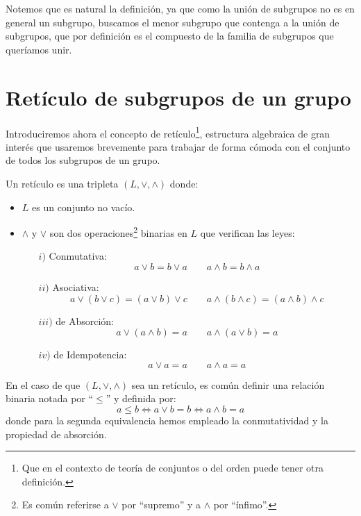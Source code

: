 Notemos que es natural la definición, ya que como la unión de subgrupos no es en general un subgrupo, buscamos el menor subgrupo que contenga a la unión de subgrupos, que por definición es el compuesto de la familia de subgrupos que queríamos unir.

\section{Retículo de subgrupos de un grupo}
Introduciremos ahora el concepto de retículo\footnote{Que en el contexto de teoría de conjuntos o del orden puede tener otra definición.}, estructura algebraica de gran interés que usaremos brevemente para trabajar de forma cómoda con el conjunto de todos los subgrupos de un grupo.

\begin{definicion}[Retículo]
    Un retículo es una tripleta $(L, \lor, \land)$ donde:
    \begin{itemize}
        \item $L$ es un conjunto no vacío.
        \item $\land$ y $\lor$ son dos operaciones\footnote{Es común referirse a $\lor$ por ``supremo'' y a $\land$ por ``ínfimo''.} binarias en $L$ que verifican las leyes:
            \begin{enumerate}
                \item[$i)$] Conmutativa:
                    \begin{equation*}
                        a\lor b = b\lor a \qquad a\land b = b\land a 
                    \end{equation*}
                \item[$ii)$] Asociativa:
                    \begin{equation*}
                        a\lor (b\lor c) = (a\lor b)\lor c \qquad a\land (b\land c) = (a\land b)\land c 
                    \end{equation*}
                \item[$iii)$] de Absorción: 
                    \begin{equation*}
                        a\lor (a\land b) = a \qquad a\land (a\lor b) = a 
                    \end{equation*}
                \item[$iv)$] de Idempotencia:
                    \begin{equation*}
                        a\lor a = a \qquad a\land a = a
                    \end{equation*}
            \end{enumerate}
    \end{itemize}
    En el caso de que $(L,\lor, \land)$ sea un retículo, es común definir una relación binaria notada por ``$\leq$'' y definida por:
    \begin{equation*}
        a\leq b \Longleftrightarrow a\lor b = b\Longleftrightarrow
        a\land b = a
    \end{equation*}
    donde para la segunda equivalencia hemos empleado la conmutatividad y la propiedad de absorción.
\end{definicion}

